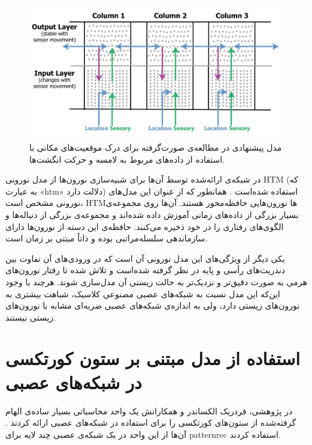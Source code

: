 \documentclass[12pt]{report}
\begin{document}
	\begin{figure}[H]
		\centering
		\includegraphics[width=1.0\linewidth]{hawkins2017.jpg}
		\caption[NS]{
			مدل پیشنهادی در مطالعه‌ی صورت‌گرفته \cite{Hawkins2017} برای درک موقعیت‌های مکانی با استفاده از داده‌های مربوط به لامسه و حرکت انگشت‌ها.
		}
		\label{fig:hawkins2017} 
	\end{figure}

در شبکه‌ی ارائه‌شده توسط آن‌ها برای شبیه‌سازی نورون‌ها از مدل نورونی  HTM (که به عبارت «\gls{htm}» دلالت دارد) استفاده شده‌است \cite{HTM2011}. همانطور که از عنوان این مدل‌های نورونی مشخص است، HTM‌ها نورون‌هایی حافظه‌محور هستند. آن‌ها روی مجموعه‌ی بسیار بزرگی از داده‌های زمانی آموزش داده شده‌اند و مجموعه‌ی بزرگی از دنباله‌ها و الگوی‌های رفتاری را در خود ذخیره می‌کنند. حافظه‌ی این دسته از نورون‌ها دارای سازماندهی سلسله‌مراتبی بوده و ذاتاً مبتنی بر زمان است.

یکی دیگر از ویژگی‌های این مدل نورونی آن است که در ورودی‌های آن تفاوت بین دندریت‌های رأسی و پایه در نظر گرفته‌‌ شده‌است و تلاش شده تا رفتار نورون‌های هرمی به صورت دقیق‌تر و نزدیک‌تر به حالت زیستی آن مدل‌سازی شوند. هرچند با وجود این‌که این مدل نسبت به شبکه‌های عصبی مصنوعی کلاسیک، شباهت بیشتری به نورون‌های زیستی دارد، ولی به اندازه‌ی شبکه‌های عصبی ضربه‌ای مشابه با نورون‌های زیستی نیستند.

\section{استفاده‌ از مدل مبتنی بر ستون کورتکسی در شبکه‌های عصبی}
در پژوهشی، فردریک الکساندر و همکارانش یک واحد محاسباتی  بسیار ساده‌ی الهام گرفته‌شده از ستون‌های کورتکسی را برای استفاده در شبکه‌های عصبی ارائه کردند \cite{Alexandre1991}. آن‌ها از این واحد در یک شبکه‌ی عصبی چند لایه برای \gls{patternrec} استفاده کردند.
\end{document}
